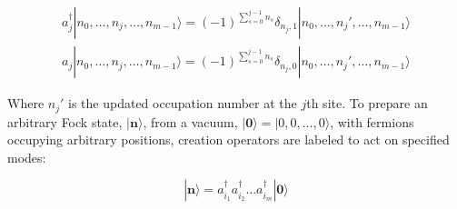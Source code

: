\begin{widetext}
    \begin{align*}
        a_j^{\dagger} |n_0, \dots, n_j, \dots, n_{m-1}\rangle = (-1)^{\sum^{j-1}_{s=0}n_s}\delta_{n_j, 1}  |n_0, \dots, n_j', \dots, n_{m-1}\rangle \\
        a_j |n_0, \dots, n_j, \dots, n_{m-1}\rangle = (-1)^{\sum^{j-1}_{s=0}n_s}\delta_{n_j, 0}  |n_0, \dots, n_j', \dots, n_{m-1}\rangle
    \end{align*}
\end{widetext}
Where $n_j'$ is the updated occupation number at the $j$th site.
To prepare an arbitrary Fock state, $|{\mathbf n}\rangle$, from a vacuum, $|{\mathbf 0}\rangle = |0,0,\dots,0\rangle$,
with fermions occupying arbitrary positions, creation operators are labeled to act on specified modes:

\begin{equation}
    |{\mathbf n}\rangle = a_{i_1}^{\dagger} a_{i_2}^{\dagger}\dots a_{i_m}^{\dagger}|{\mathbf 0}\rangle
\end{equation}

